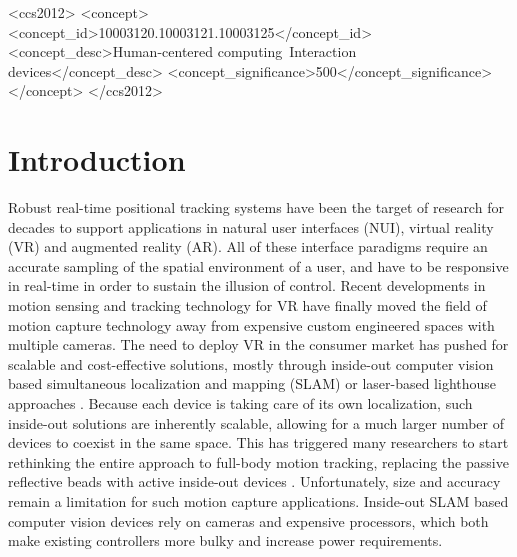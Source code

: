 \documentclass[sigchi]{acmart}
\begin{document}

\begin{CCSXML}
<ccs2012>
<concept>
<concept_id>10003120.10003121.10003125</concept_id>
<concept_desc>Human-centered computing~Interaction devices</concept_desc>
<concept_significance>500</concept_significance>
</concept>
</ccs2012>
\end{CCSXML}





\maketitle

\section{Introduction}
Robust real-time positional tracking systems have been the target of research for decades to support applications in natural user interfaces (NUI), virtual reality (VR) and augmented reality (AR). All of these interface paradigms require an accurate sampling of the spatial environment of a user, and have to be responsive in real-time in order to sustain the illusion of control. Recent developments in motion sensing and tracking technology for VR have finally moved the field of motion capture technology away from expensive custom engineered spaces with multiple cameras. The need to deploy VR in the consumer market has pushed for scalable and cost-effective solutions, mostly through inside-out computer vision based simultaneous localization and mapping (SLAM) \cite{Klein2007,Whelan2016} or laser-based lighthouse approaches \cite{Borges2018}.
\newline
Because each device is taking care of its own localization, such inside-out solutions are inherently scalable, allowing for a much larger number of devices to coexist in the same space. This has triggered many researchers to start rethinking the entire approach to full-body motion tracking, replacing the passive reflective beads with active inside-out devices \cite{Jiang2016}. Unfortunately, size and accuracy remain a limitation for such motion capture applications. Inside-out SLAM based computer vision devices rely on cameras and expensive processors, which both make existing controllers more bulky and increase power requirements.
\end{document}
